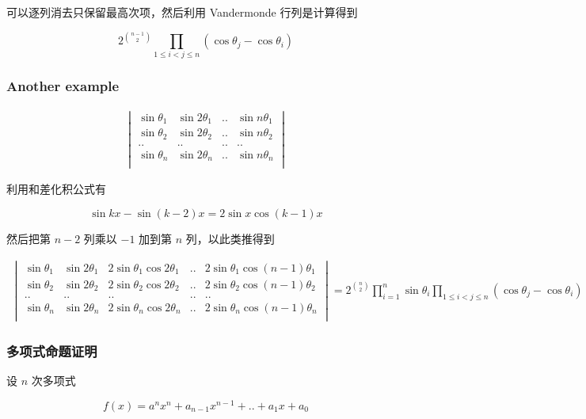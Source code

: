 \documentclass[12pt,a4paper]{ctexart}
\begin{document}
可以逐列消去只保留最高次项，然后利用 Vandermonde 行列是计算得到

\[
2^{\binom{n-1}{2}}\prod_{1 \le i < j \le n}\left( \cos \theta_j - \cos \theta_i \right)
\]

\subsubsection{Another example}

\begin{align*}
    \begin{vmatrix}
        \sin \theta_1 & \sin 2 \theta_1 & .. & \sin n \theta_1 \\
        \sin \theta_2 & \sin 2 \theta_2 & .. & \sin n \theta_2 \\
        .. & .. & .. & .. \\
        \sin \theta_n & \sin 2 \theta_n & .. & \sin n \theta_n \\
    \end{vmatrix}
\end{align*}

利用和差化积公式有

\[
\sin kx - \sin(k-2)x = 2 \sin x \cos (k-1)x
\]

然后把第 $n-2$ 列乘以 $-1$ 加到第 $n$ 列，以此类推得到

\begin{align*}
    \begin{vmatrix}
        \sin \theta_1 & \sin 2 \theta_1 & 2\sin\theta_1 \cos 2 \theta_1 & .. & 2\sin\theta_1 \cos (n-1) \theta_1\\
        \sin \theta_2 & \sin 2 \theta_2 & 2\sin\theta_2 \cos 2 \theta_2 & .. & 2\sin\theta_2 \cos (n-1) \theta_2\\
        .. & .. & .. & .. & ..\\
        \sin \theta_n & \sin 2 \theta_n & 2\sin\theta_n \cos 2 \theta_n & .. & 2\sin\theta_n \cos (n-1) \theta_n\\
    \end{vmatrix} = 2^{\binom{n}{2}}\prod_{i=1}^{n} \sin \theta_i \prod_{1 \le i < j \le n}\left( \cos \theta_j - \cos \theta_i \right)
\end{align*}

\subsubsection{多项式命题证明}

设 $n$ 次多项式

\[
f(x) = a^nx^n + a_{n-1}x^{n-1} + .. + a_1x + a_0
\]
\end{document}
